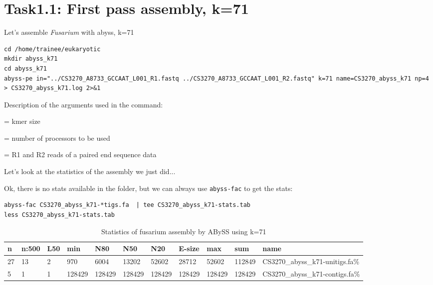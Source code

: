 \section{Task1.1: First pass assembly, k=71}

\begin{steps}
Let's assemble \textit{Fusarium} with abyss, k=71
\begin{lstlisting}
cd /home/trainee/eukaryotic
mkdir abyss_k71
cd abyss_k71
abyss-pe in="../CS3270_A8733_GCCAAT_L001_R1.fastq ../CS3270_A8733_GCCAAT_L001_R2.fastq" k=71 name=CS3270_abyss_k71 np=4 > CS3270_abyss_k71.log 2>&1
\end{lstlisting}
\end{steps}

Description of the arguments used in the command:
\begin{description}[style=multiline,labelindent=0cm,align=right,leftmargin=\descriptionlabelspace,rightmargin=1.5cm,font=\ttfamily]
  \item[k] = kmer size
  \item[np] = number of processors to be used
  \item[sequence file names] = R1 and R2 reads of a paired end sequence data
\end{description}

\begin{steps}
Let's look at the statistics of the assembly we just did... 

Ok, there is no stats available in the folder, but we can always use \texttt{abyss-fac} to get the stats:
\begin{lstlisting}
abyss-fac CS3270_abyss_k71-*tigs.fa  | tee CS3270_abyss_k71-stats.tab
less CS3270_abyss_k71-stats.tab
\end{lstlisting}
\end{steps}


\begin{table}[H]
\small
  \centering
  \caption{Statistics of fusarium assembly by ABySS using k=71}
    \begin{tabular}{lllllllllll}
    \toprule
    \textbf{n} & \textbf{n:500} & \textbf{L50} & \textbf{min} & \textbf{N80}& \textbf{N50}& \textbf{N20}& \textbf{E-size}& \textbf{max} & \textbf{sum}& \textbf{name}\\
    \midrule
    27 & 13 & 2 & 970 & 6004 & 13202 & 52602 & 28712 & 52602 & 112849 & CS3270\_abyss\_k71-unitigs.fa\% \\
    5 & 1 & 1 & 128429 & 128429 & 128429 & 128429 & 128429 & 128429 & 128429 & CS3270\_abyss\_k71-contigs.fa\% \\
    \bottomrule
    \end{tabular}
  \label{tab:fusariumk71}
\end{table}


